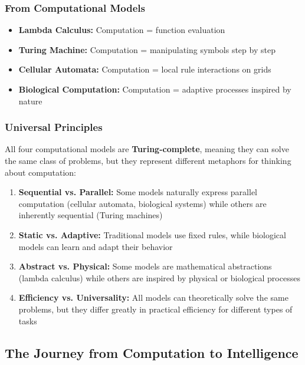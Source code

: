 \subsubsection{From Computational Models}

\begin{itemize}
\item \textbf{Lambda Calculus:} Computation = function evaluation
\item \textbf{Turing Machine:} Computation = manipulating symbols step by step
\item \textbf{Cellular Automata:} Computation = local rule interactions on grids
\item \textbf{Biological Computation:} Computation = adaptive processes inspired by nature
\end{itemize}

\subsubsection{Universal Principles}

All four computational models are \textbf{Turing-complete}, meaning they can solve the same class of problems, but they represent different metaphors for thinking about computation:

\begin{enumerate}
\item \textbf{Sequential vs. Parallel:} Some models naturally express parallel computation (cellular automata, biological systems) while others are inherently sequential (Turing machines)

\item \textbf{Static vs. Adaptive:} Traditional models use fixed rules, while biological models can learn and adapt their behavior

\item \textbf{Abstract vs. Physical:} Some models are mathematical abstractions (lambda calculus) while others are inspired by physical or biological processes

\item \textbf{Efficiency vs. Universality:} All models can theoretically solve the same problems, but they differ greatly in practical efficiency for different types of tasks
\end{enumerate}

\subsection{The Journey from Computation to Intelligence}

